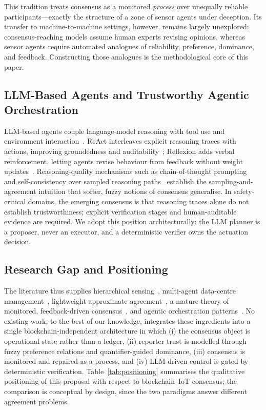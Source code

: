 \documentclass[preprint,11pt]{elsarticle}
\begin{document}
This tradition treats consensus as a monitored \emph{process} over
unequally reliable participants---exactly the structure of a zone of
sensor agents under deception. Its transfer to machine-to-machine
settings, however, remains largely unexplored: consensus-reaching
models assume human experts revising opinions, whereas sensor agents
require automated analogues of reliability, preference, dominance, and
feedback. Constructing those analogues is the methodological core of
this paper.

\subsection{LLM-Based Agents and Trustworthy Agentic Orchestration}
\label{sec:related_llm}

LLM-based agents couple language-model reasoning with tool use and
environment interaction~\cite{wang2024agents}. ReAct interleaves
explicit reasoning traces with actions, improving groundedness and
auditability~\cite{yao2023react}; Reflexion adds verbal reinforcement,
letting agents revise behaviour from feedback without weight
updates~\cite{shinn2023reflexion}. Reasoning-quality mechanisms such as
chain-of-thought prompting~\cite{wei2022cot} and self-consistency over
sampled reasoning paths~\cite{wang2023selfconsistency} establish the
sampling-and-agreement intuition that softer, fuzzy notions of consensus
generalise. In safety-critical domains, the emerging consensus is that
reasoning traces alone do not establish trustworthiness; explicit
verification stages and human-auditable evidence are required. We adopt
this position architecturally: the LLM planner is a proposer, never an
executor, and a deterministic verifier owns the actuation decision.

\subsection{Research Gap and Positioning}
\label{sec:positioning}

The literature thus supplies hierarchical sensing~\cite{jiang2019,
yan2021}, multi-agent data-centre management~\cite{das2008,tesauro2004},
lightweight approximate agreement~\cite{zhang2021approx}, a mature
theory of monitored, feedback-driven consensus~\cite{herreraviedma2014},
and agentic orchestration patterns~\cite{yao2023react,shinn2023reflexion}.
No existing work, to the best of our knowledge, integrates these
ingredients into a single blockchain-independent architecture in which
(i) the consensus object is operational state rather than a ledger,
(ii) reporter trust is modelled through fuzzy preference relations and
quantifier-guided dominance, (iii) consensus is monitored and repaired
as a process, and (iv) LLM-driven control is gated by deterministic
verification. Table~\ref{tab:positioning} summarises the qualitative
positioning of this proposal with respect to blockchain--IoT consensus;
the comparison is conceptual by design, since the two paradigms answer
different agreement problems.
\end{document}
